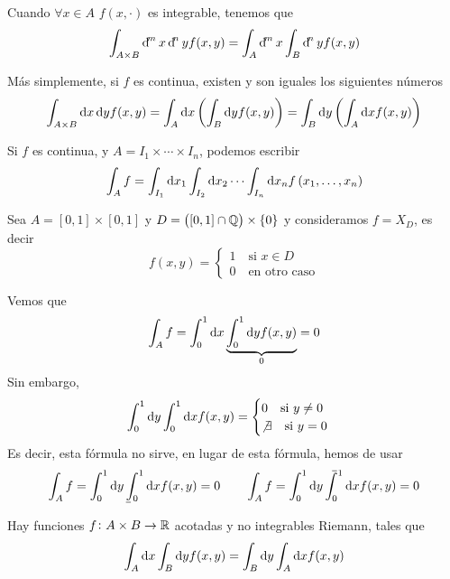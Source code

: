 \begin{obs}
    Cuando $\forall x \in A$ $f(x, \cdot)$ es integrable, tenemos que
    \[
        \int_{A \times B} \dif^m x \dif^n y f(x, y) = \int_A \dif^m x \int_B \dif^n y
        f(x, y)
    \]
\end{obs}

\begin{obs}
	Más simplemente, si $f$ es continua, existen y son iguales los siguientes números
	\[
		\int_{A \times B} \dif x \dif y f(x, y) = \int_A \dif x \left(\int_B
		\dif y f(x, y) \right) = \int_B \dif y \left( \int_A \dif x f(x, y) \right)
	\]
\end{obs}

\begin{col}
    Si $f$ es continua, y $A = I_1 \times \cdots \times I_n$, podemos escribir
    \[
        \int_A f = \int_{I_1} \dif x_1 \int_{I_2} \dif x_2 \cdots \int_{I_n} \dif x_n
        f\left( x_1, \dots , x_n \right)
    \]
\end{col}

\begin{example}
    Sea $A = [0,1] \times [0,1]$ y $D = \left( [0,1] \cap \mathbb{Q} \right) \times \{0\}$ y
    consideramos $f = X_D$, es decir
    \[
        f(x, y) =
        \begin{cases}
            1 \quad \text{si } x \in D \\ 0 \quad \text{en otro caso}
        \end{cases}
    \]

    Vemos que 
    \[
        \int_A f = \int^1_0 \dif x \underbrace{\int^1_0 \dif y f(x, y)}_{0} = 0
    \]
    Sin embargo,
    \[
        \int^1_0 \dif y \int^1_0 \dif x f(x, y) =
        \begin{cases}
            0 \quad \text{si } y \neq 0 \\
            \not\exists \quad \text{si } y = 0
        \end{cases}
    \]
    Es decir, esta fórmula no sirve, en lugar de esta fórmula, hemos de usar
    \[
        \int_A f = \int^1_0 \dif y \lowint^1_0 \dif x f(x, y) = 0 \qquad
        \int_A f = \int^1_0 \dif y \upint^1_0 \dif x f(x, y) = 0
    \]
\end{example}

\begin{obs}
    Hay funciones $f \colon A \times B \to \mathbb{R}$ acotadas y no integrables Riemann,
    tales que
    \[
        \int_A \dif x \int_B \dif y f(x, y) = \int_B \dif y \int_A \dif x f(x, y)
    \]
\end{obs}

